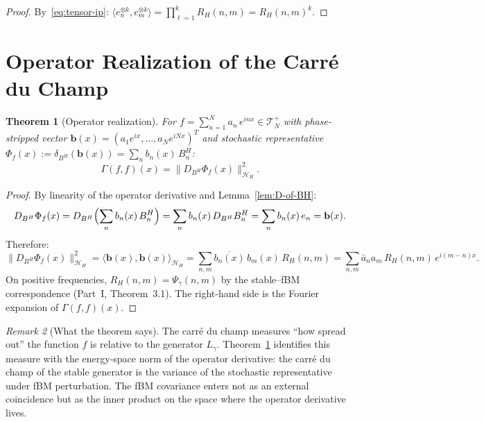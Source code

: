 \documentclass[11pt,a4paper]{article}
\theoremstyle{plain}
\newtheorem{theorem}{Theorem}[section]
\theoremstyle{definition}
\theoremstyle{remark}
\newtheorem{remark}[theorem]{Remark}
\newcommand{\HH}{\mathcal{H}_H}
\begin{document}
\begin{proof}
By~\eqref{eq:tensor-ip}:
$\langle e_n^{\otimes k}, e_m^{\otimes k} \rangle
= \prod_{\ell=1}^k R_H(n,m) = R_H(n,m)^k$.
\end{proof}


\section{Operator Realization of the Carr\'e du Champ}
\label{sec:realization}

\begin{theorem}[Operator realization]
\label{thm:realization}
For $f = \sum_{n=1}^N a_n\,e^{inx} \in \mathcal{T}_N^+$
with phase-stripped vector
$\mathbf{b}(x) = (a_1 e^{ix}, \ldots, a_N e^{iNx})^T$
and stochastic representative
$\Phi_f(x) := \delta_{B^H}(\mathbf{b}(x))
= \sum_n b_n(x)\,B_n^H$:
\begin{equation}\label{eq:realization}
  \Gamma(f,f)(x)
  = \bigl\|D_{B^H}\Phi_f(x)\bigr\|^2_{\HH}.
\end{equation}
\end{theorem}

\begin{proof}
By linearity of the operator derivative and
Lemma~\ref{lem:D-of-BH}:
\[
  D_{B^H}\Phi_f(x)
  = D_{B^H}\Bigl(\sum_n b_n(x)\,B_n^H\Bigr)
  = \sum_n b_n(x)\,D_{B^H}B_n^H
  = \sum_n b_n(x)\,e_n
  = \mathbf{b}(x).
\]
Therefore:
\[
  \bigl\|D_{B^H}\Phi_f(x)\bigr\|^2_{\HH}
  = \langle \mathbf{b}(x), \mathbf{b}(x) \rangle_{\HH}
  = \sum_{n,m} \overline{b_n(x)}\,b_m(x)\,R_H(n,m)
  = \sum_{n,m} \bar{a}_n a_m\,R_H(n,m)\,e^{i(m-n)x}.
\]
On positive frequencies, $R_H(n,m) = \Psi_\gamma(n,m)$
by the stable--fBM correspondence (Part~I, Theorem~3.1).
The right-hand side is the Fourier expansion of
$\Gamma(f,f)(x)$.
\end{proof}

\begin{remark}[What the theorem says]\label{rem:what}
The carr\'e du champ measures ``how spread out'' the
function $f$ is relative to the generator $L_\gamma$.
Theorem~\ref{thm:realization} identifies this measure
with the energy-space norm of the operator derivative:
the carr\'e du champ of the stable generator is the
variance of the stochastic representative under fBM
perturbation.  The fBM covariance enters not as an
external coincidence but as the inner product on the
space where the operator derivative lives.
\end{remark}
\end{document}
